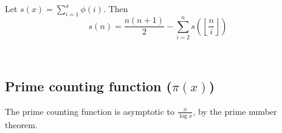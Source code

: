 	Let $s(x)=\sum_{i=1}^x\phi(i).$ Then 
	\[s(n)=\frac{n(n+1)}{2}-\sum_{i=2}^ns\left(\left\lfloor\frac{n}{i}\right\rfloor\right)\]


\
	
	
\subsection{Prime counting function ($\pi(x)$)} The prime counting function is asymptotic to $\frac{x}{\log x}$, by the prime number theorem.

\iffalse
\subsection{Polya Enumeration theorem}
The enumeration theorem employs a multivariate generating function called the cycle index:
$$Z_{G}(t_{1},t_{2},\ldots ,t_{n})={\frac {1}{|G|}}\sum _{g\in G}t_{1}^{j_{1}(g)}t_{2}^{j_{2}(g)}\cdots t_{n}^{j_{n}(g)}\,,$$
where $n$ is the number of elements of $X$ and $j_k(g)$ is the number of $k$-cycles of the group element $g$ as a permutation of $X$.

The theorem states that the generating function F of the number of colored arrangements by weight is given by:
$$F(t)=Z_{G}(f(t),f(t^{2}),f(t^{3}),\ldots ,f(t^{n}))\,,$$
or in the multivariate case:
$$F(t_{1},\ldots )=Z_{G}(f(t_{1},\ldots ),f(t_{1}^{2},\ldots ),f(t_{1}^{3},\ldots ),\ldots ,f(t_{1}^{n},\ldots ))\,.$$

For instance, when seperating the graphs with the number of edges, we let $f(t)=1+t$, and examine the coefficient of $t^i$ for a graph with $i$ edges, and when seperating the necklaces with the number of beads with three different colors, we let $f(x,y,z)=x+y+z$, and examine the coefficient of $x^iy^jz^k$.
\fi
      

